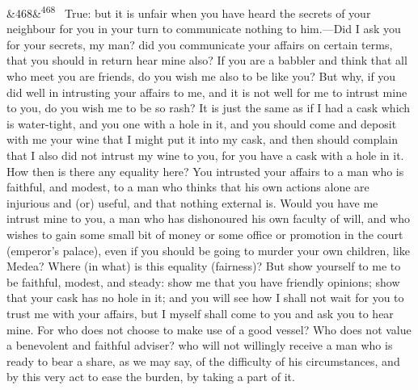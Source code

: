 \documentclass[12pt]{article}
\newcommand{\para}[1][]{\par\noindent\ifx&#1&\else\textsuperscript{\footnotesize #1}~\fi}
\begin{document}
\para[468] True: but it is unfair when you have heard the secrets of your neighbour for you in your turn to communicate nothing to him.—Did I ask you for your secrets, my man? did you communicate your affairs on certain terms, that you should in return hear mine also? If you are a babbler and think that all who meet you are friends, do you wish me also to be like you? But why, if you did well in intrusting your affairs to me, and it is not well for me to intrust mine to you, do you wish me to be so rash? It is just the same as if I had a cask which is water-tight, and you one with a hole in it, and you should come and deposit with me your wine that I might put it into my cask, and then should complain that I also did not intrust my wine to you, for you have a cask with a hole in it. How then is there any equality here? You intrusted your affairs to a man who is faithful, and modest, to a man who thinks that his own actions alone are injurious and (or) useful, and that nothing external is. Would you have me intrust mine to you, a man who has dishonoured his own faculty of will, and who wishes to gain some small bit of money or some office or promotion in the court (emperor's palace), even if you should be going to murder your own children, like Medea? Where (in what) is this equality (fairness)? But show yourself to me to be faithful, modest, and steady: show me that you have friendly opinions; show that your cask has no hole in it; and you will see how I shall not wait for you to trust me with your affairs, but I myself shall come to you and ask you to hear mine. For who does not choose to make use of a good vessel? Who does not value a benevolent and faithful adviser? who will not willingly receive a man who is ready to bear a share, as we may say, of the difficulty of his circumstances, and by this very act to ease the burden, by taking a part of it.
\end{document}
